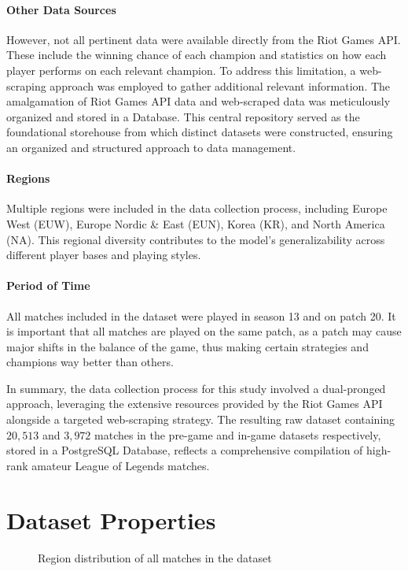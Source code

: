 \documentclass[12pt, a4paper, headinclude, twoside, plainheadsepline, open=right, numbers=noenddot, hidelinks, toc=listof, toc=bibliography]{scrreprt}
\begin{document}
\paragraph{Other Data Sources}
However, not all pertinent data were available directly from the Riot Games API.
These include the winning chance of each champion and statistics on how each player performs on each relevant champion.
To address this limitation, a web-scraping approach was employed to gather additional relevant information. The amalgamation of Riot Games API data and web-scraped data was meticulously organized and stored in a Database.
This central repository served as the foundational storehouse from which distinct datasets were constructed, ensuring an organized and structured approach to data management.
\paragraph{Regions}
Multiple regions were included in the data collection process, including Europe West (EUW), Europe Nordic \& East (EUN), Korea (KR), and North America (NA).
This regional diversity contributes to the model's generalizability across different player bases and playing styles.
\paragraph{Period of Time}
All matches included in the dataset were played in season 13 and on patch 20.
It is important that all matches are played on the same patch, as a patch may cause major shifts in the balance of the game, thus making certain strategies and champions way better than others.

In summary, the data collection process for this study involved a dual-pronged approach, leveraging the extensive resources provided by the Riot Games API alongside a targeted web-scraping strategy.
The resulting raw dataset containing $20,513$ and  $3,972$ matches in the pre-game and in-game datasets respectively, stored in a PostgreSQL Database, reflects a comprehensive compilation of high-rank amateur League of Legends matches.

\section{Dataset Properties}
\label{sec:dataprop}

\begin{figure}

\caption{Region distribution of all matches in the dataset}
\label{fig:platformId}
\end{figure}
\end{document}
